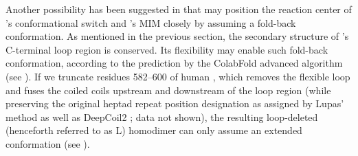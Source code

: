 Another possibility has been suggested in \cite{Structure1GO4, SpMad1} that  may position the reaction center of 's conformational switch and 's MIM closely by assuming a fold-back conformation. As mentioned in the previous section, the secondary structure of 's C-terminal loop region is conserved. Its flexibility may enable such fold-back conformation, according to the prediction by the ColabFold advanced algorithm (see ). If we truncate residues 582--600 of human , which removes the flexible loop and fuses the coiled coils upstream and downstream of the loop region (while preserving the original heptad repeat position designation as assigned by Lupas' method \cite{LupasCOILS} as well as DeepCoil2 \cite{DeepCoil}; data not shown), the resulting loop-deleted  (henceforth referred to as \textDelta{}L) homodimer can only assume an extended conformation (see ).

